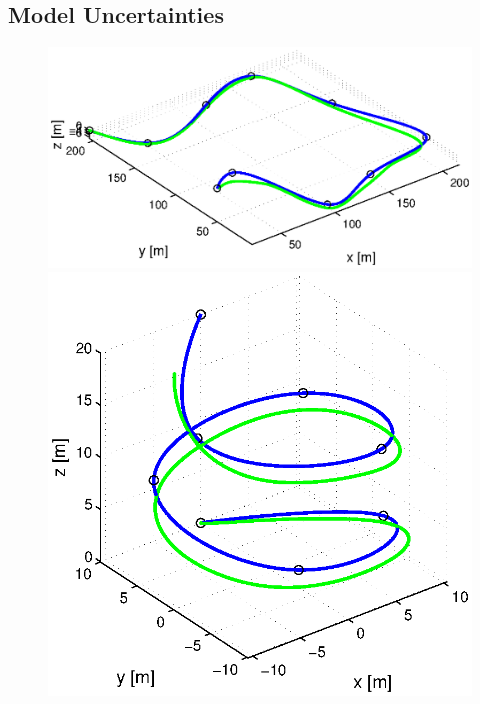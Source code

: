 \subsection{Model Uncertainties}
\label{sub:results_model_uncertainties}

\begin{figure}[h]
  \begin{minipage}[t]{0.32\textwidth}
    \includegraphics[width = \textwidth]{trackings_wc/figure_3D_road_SplineDegree3_trajectoryFollowing_Disturbance_0}
  \end{minipage}
  \hfill
  \begin{minipage}[t]{0.32\textwidth}
    \includegraphics[width = \textwidth]{trackings_wc/figure_3D_helix_SplineDegree3_trajectoryFollowing_Disturbance_0}

\end{minipage}
\end{figure}

